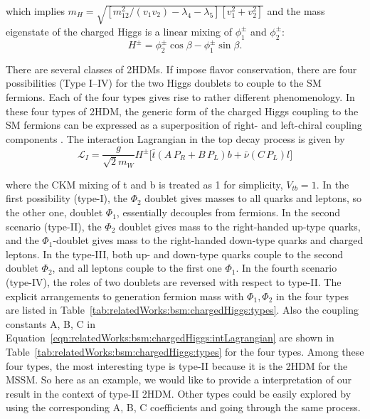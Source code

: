 \noindent which implies $m_{H} = \sqrt{ [m_{12}^2 /(v_1 v_2) - \lambda_4 - \lambda_5] [v_1^2+v_2^2]} $ and the mass eigenstate of the charged Higgs is a linear mixing of $\phi^\pm_1$ and $\phi^\pm_2$:
\begin{equation}
H^\pm = \phi_2^\pm \cos \beta - \phi_1^\pm \sin \beta .
\end{equation}


There are several classes of 2HDMs. If impose flavor conservation, there are four possibilities (Type I–IV) for the two Higgs doublets to couple to the SM fermions. Each of the four types gives rise to rather different phenomenology. In these four types of 2HDM, the generic form of the charged Higgs coupling to the SM fermions can be expressed as a superposition of right- and left-chiral coupling components \cite{PhysRevD.41.3421}. The interaction Lagrangian in the top decay process is given by
\begin{equation}
	\mathcal{L}_{I} =  \frac{g}{\sqrt{2} m_W} H^\pm \bigg[  \bar{t} (A \, P_R + B \, P_L) b + \bar{\nu}  (C\, P_L)  l \bigg]
    \label{eqn:relatedWorks:bsm:chargedHiggs:intLagrangian}
\end{equation}

\noindent where the CKM mixing of t and b is treated as 1 for simplicity, $V_{tb}=1$. In the first possibility (type-I), the $\Phi_2$ doublet gives masses to all quarks and leptons, so the other one, doublet $\Phi_1$, essentially decouples from fermions. In the second scenario (type-II), the $\Phi_2$ doublet gives mass to the right-handed up-type quarks, and the $\Phi_1$-doublet gives mass to the right-handed down-type quarks and charged leptons. In the type-III, both up- and down-type quarks couple to the second doublet $\Phi_2$, and all leptons couple to the first one $\Phi_1$. In the fourth scenario (type-IV), the roles of two doublets are reversed with respect to type-II. The explicit arrangements to generation fermion mass with $\Phi_1,\Phi_2$ in the four types are listed in Table~\ref{tab:relatedWorks:bsm:chargedHiggs:types}. Also the coupling constants A, B, C in Equation~\ref{eqn:relatedWorks:bsm:chargedHiggs:intLagrangian} are shown in  Table~\ref{tab:relatedWorks:bsm:chargedHiggs:types} for the four types. Among these four types, the most interesting type is type-II because it is the 2HDM for the MSSM. So here as an example, we would like to provide a interpretation of our result in the context of type-II 2HDM. Other types could be easily explored by using the corresponding A, B, C coefficients and going through the same process.

